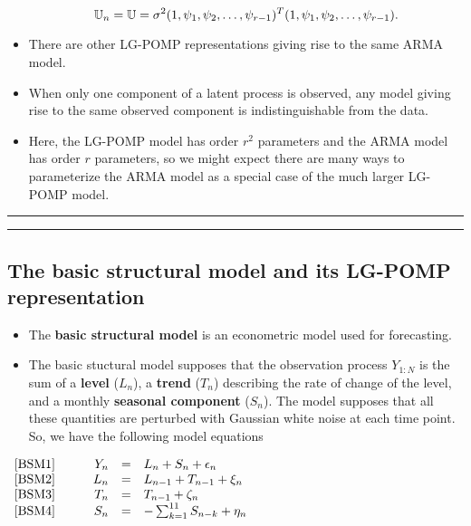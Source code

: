 \documentclass[]{article}
\begin{document}
\begin{itemize}
  \[\mathbb{U}_n = \mathbb{U} = \sigma^2 (1, \psi_1,\psi_2,\dots,\psi_{r-1})^{\scriptsize{T}}(1, \psi_1,\psi_2,\dots,\psi_{r-1}).\]
\item
  There are other LG-POMP representations giving rise to the same ARMA
  model.
\item
  When only one component of a latent process is observed, any model
  giving rise to the same observed component is indistinguishable from
  the data.
\item
  Here, the LG-POMP model has order \(r^2\) parameters and the ARMA
  model has order \(r\) parameters, so we might expect there are many
  ways to parameterize the ARMA model as a special case of the much
  larger LG-POMP model.
\end{itemize}

\begin{center}\rule{0.5\linewidth}{\linethickness}\end{center}

\begin{center}\rule{0.5\linewidth}{\linethickness}\end{center}

\subsection{The basic structural model and its LG-POMP
representation}\label{the-basic-structural-model-and-its-lg-pomp-representation}

\begin{itemize}
\item
  The \textbf{basic structural model} is an econometric model used for
  forecasting.
\item
  The basic stuctural model supposes that the observation process
  \(Y_{1:N}\) is the sum of a \textbf{level} (\(L_n\)), a \textbf{trend}
  (\(T_n\)) describing the rate of change of the level, and a monthly
  \textbf{seasonal component} (\(S_n\)). The model supposes that all
  these quantities are perturbed with Gaussian white noise at each time
  point. So, we have the following model equations
\end{itemize}

\(\begin{array}{lrcl} \mbox{[BSM1]} \quad\quad & Y_n &=& L_n + S_n + \epsilon_n \\ \mbox{[BSM2]} \quad\quad & L_{n} &=& L_{n-1} + T_{n-1} + \xi_n \\ \mbox{[BSM3]} \quad\quad & T_{n} &=& T_{n-1} + \zeta_n \\ \mbox{[BSM4]} \quad\quad & S_{n} &=& -\sum_{k=1}^{11} S_{n-k} + \eta_n \end{array}\)
\end{document}
